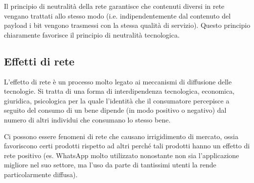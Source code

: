 Il principio di neutralità della rete garantisce che contenuti diversi in rete vengano trattati allo stesso modo (i.e. indipendentemente dal contenuto del payload i bit vengono trasmessi con la stessa qualità di servizio).
Questo principio chiaramente favorisce il principio di neutralità tecnologica. 

\subsection{Effetti di rete}
L'effetto di rete è un processo molto legato ai meccanismi di diffusione delle tecnologie. Si tratta di una forma di interdipendenza tecnologica, economica, giuridica, psicologica per la quale l'identità che il consumatore percepisce a seguito del consumo di un bene dipende (in modo positivo o negativo) dal numero di altri individui che consumano lo stesso bene. 

Ci possono essere fenomeni di rete che causano irrigidimento di mercato, ossia favoriscono certi prodotti rispetto ad altri perché tali prodotti hanno un effetto di rete positivo (es. WhatsApp molto utilizzato nonostante non sia l'applicazione migliore nel suo settore, ma l'uso da parte di tantissimi utenti la rende particolarmente diffusa). 

